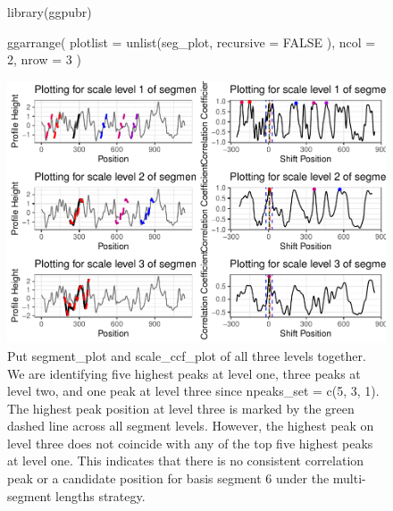 \begin{figure}
\vspace{1em}
\begin{adjustbox}{valign=t}
\begin{minipage}{.39\textwidth}

{\small {}
\begin{Schunk}
\begin{Sinput}
library(ggpubr)

ggarrange(
  plotlist =
    unlist(seg_plot,
      recursive = FALSE
    ),
  ncol = 2,
  nrow = 3
)
\end{Sinput}
\end{Schunk}
}
\vspace{1em}
\end{minipage}
\begin{minipage}{.59\textwidth}
\includegraphics[width=\textwidth]{ju-hofmann_files/figure-latex/segplot3-1.pdf}
\end{minipage}
\end{adjustbox}
\caption{\label{fig:seg_all} Put segment\_plot and scale\_ccf\_plot of all three levels together. We are identifying five highest peaks at level one, three peaks at level two, and one peak at level three since npeaks\_set = c(5, 3, 1). The highest peak position at level three is marked by the green dashed line across all segment levels. However, the highest peak on level three does not coincide with any of the top five highest peaks at level one. This indicates that there is no consistent correlation peak or a candidate position for basis segment 6 under the multi-segment lengths strategy.}
\end{figure}

